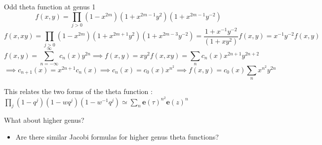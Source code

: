 \documentclass[11pt,aspectratio=169]{beamer}
\newcommand{\ee}[0]{\mathbf{e}}
\begin{document}
\begin{frame}{Odd theta function at genus 1}
    \[f(x,y) = \prod_{j>0} (1-x^{2m})(1+x^{2m-1}y^2)(1+x^{2m-1}y^{-2})\]
    \[f(x,xy) = \prod_{j>0} (1-x^{2m})(1+x^{2m+1}y^2)(1+x^{2m-3}y^{-2}) = \frac{1+x^{-1}y^{-2}}{(1+xy^2)}f(x,y) = x^{-1}y^{-2}f(x,y)\]
    \[f(x,y) = \sum_{n=-\infty}^\infty c_n(x) y^{2n} \implies f(x,y) = xy^2 f(x,xy) = \sum_n c_n(x) x^{2n+1}y^{2n+2}\]
    \[\implies c_{n+1}(x) = x^{2n+1}c_n(x) \implies c_{n}(x) = c_0(x) x^{n^2} \implies f(x,y) = c_0(x) \sum_n x^{n^2} y^{2n}\]

    This relates the two forms of the theta function : $\prod_j (1-q^j) (1-wq^j)(1-w^{-1}q^j) \simeq \sum_n \ee(\tau)^{n^2} \ee(z)^{n}$

    {
        \begin{block}{What about higher genus?}
            \begin{itemize}
                \item Are there similar Jacobi formulas for higher genus theta functions?
            \end{itemize}
        \end{block}
    }
\end{frame}
\end{document}
